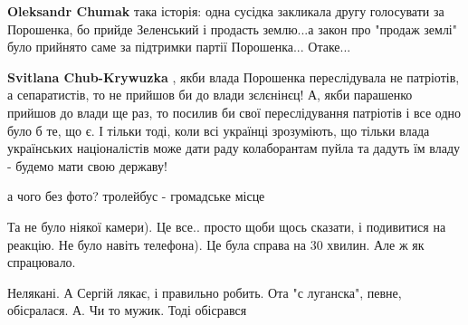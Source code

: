 \begin{itemize}
\begin{itemize}
\textbf{Oleksandr Chumak} така історія: одна сусідка закликала другу голосувати за Порошенка, бо прийде Зеленський і продасть землю...а закон про "продаж землі" було прийнято саме за підтримки партії Порошенка... Отаке...

 
\textbf{Svitlana Chub-Krywuzka} , якби влада Порошенка переслідувала не
патріотів, а сепаратистів, то не прийшов би до влади зєлєнінєц! А, якби
парашенко прийшов до влади ще раз, то посилив би свої переслідування патріотів
і все одно було б те, що є. І тільки тоді, коли всі українці зрозуміють, що
тільки влада українських націоналістів може дати раду колаборантам пуйла та
дадуть їм владу - будемо мати свою державу!
\end{itemize}

 
а чого без фото? тролейбус - громадське місце

\begin{itemize}
 
Та не було ніякої камери). Це все.. просто щоби щось сказати, і подивитися на реакцію. Не було навіть телефона). Це була справа на 30 хвилин.
Але ж як спрацювало.
\end{itemize}

 
Нелякані. А Сергій лякає, і правильно робить.
Ота "с луганска", певне, обісралася.
А. Чи то мужик. Тоді обісрався

\begin{itemize}
 

\end{itemize}
\end{itemize}
